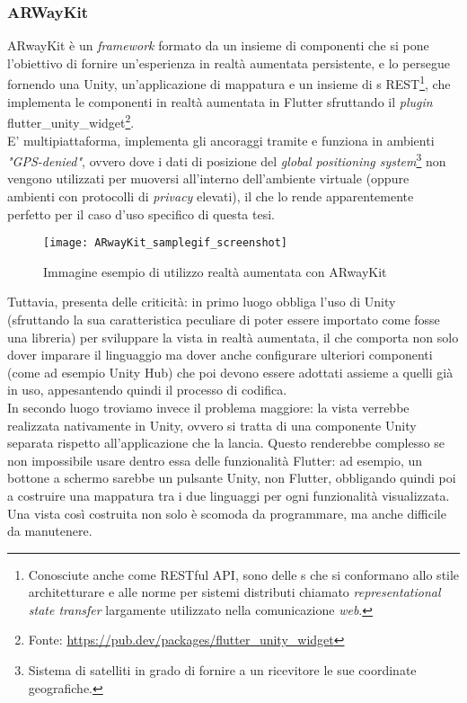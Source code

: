 \subsubsection{ARWayKit}
ARwayKit è un \textit{framework} formato da un insieme di componenti che si pone l'obiettivo di fornire un'esperienza in realtà aumentata persistente, e lo persegue fornendo una \sdk{} Unity, un'applicazione di mappatura e un insieme di \api{}s REST\footnote{Conosciute anche come RESTful API, sono delle \api{}s che si conformano allo stile architetturare e alle norme per sistemi distributi chiamato \textit{representational state transfer} largamente utilizzato nella comunicazione \textit{web}.}, che implementa le componenti in realtà aumentata in Flutter sfruttando il \textit{plugin} flutter\_unity\_widget\footnote{Fonte: \url{https://pub.dev/packages/flutter_unity_widget}}.\\
E' multipiattaforma, implementa gli ancoraggi tramite \asa{} e funziona in ambienti \textit{"GPS-denied"}, ovvero dove i dati di posizione del \textit{global positioning system}\footnote{Sistema di satelliti in grado di fornire a un ricevitore le sue coordinate geografiche.} non vengono utilizzati per muoversi all'interno dell'ambiente virtuale (oppure ambienti con protocolli di \textit{privacy} elevati), il che lo rende apparentemente perfetto per il caso d'uso specifico di questa tesi. 

\begin{figure}[H]
  \centering
  \texttt{[image: ARwayKit\_samplegif\_screenshot]}
  \caption[Realtà aumentata con ARwayKit]{Immagine esempio di utilizzo realtà aumentata con ARwayKit\footnotemark}
\end{figure}

Tuttavia, presenta delle criticità: in primo luogo obbliga l'uso di Unity (sfruttando la sua caratteristica peculiare di poter essere importato come fosse una libreria) per sviluppare la vista in realtà aumentata, il che comporta non solo dover imparare il linguaggio ma dover anche configurare ulteriori componenti (come ad esempio Unity Hub) che poi devono essere adottati assieme a quelli già in uso, appesantendo quindi il processo di codifica.\\
In secondo luogo troviamo invece il problema maggiore: la vista verrebbe realizzata nativamente in Unity, ovvero si tratta di una componente Unity separata rispetto all'applicazione che la lancia.
Questo renderebbe complesso se non impossibile usare dentro essa delle funzionalità Flutter: ad esempio, un bottone a schermo sarebbe un pulsante Unity, non Flutter, obbligando quindi poi a costruire una mappatura tra i due linguaggi per ogni funzionalità visualizzata.\\ 
Una vista così costruita non solo è scomoda da programmare, ma anche difficile da manutenere.

